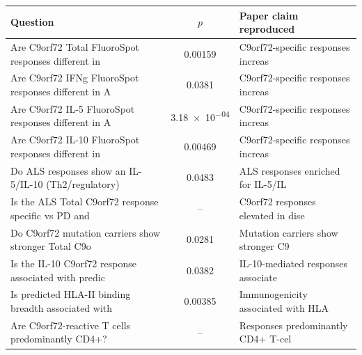 \begin{tabular}{p{6.2cm}cp{4.3cm}}
\toprule
Question & $p$ & Paper claim reproduced \\
\midrule
Are C9orf72 Total FluoroSpot responses different in  & 0.00159 & C9orf72-specific responses increas \\
Are C9orf72 IFNg FluoroSpot responses different in A & 0.0381 & C9orf72-specific responses increas \\
Are C9orf72 IL-5 FluoroSpot responses different in A & \num{3.18e-04} & C9orf72-specific responses increas \\
Are C9orf72 IL-10 FluoroSpot responses different in  & 0.00469 & C9orf72-specific responses increas \\
Do ALS responses show an IL-5/IL-10 (Th2/regulatory) & 0.0483 & ALS responses enriched for IL-5/IL \\
Is the ALS Total C9orf72 response specific vs PD and & -- & C9orf72 responses elevated in dise \\
Do C9orf72 mutation carriers show stronger Total C9o & 0.0281 & Mutation carriers show stronger C9 \\
Is the IL-10 C9orf72 response associated with predic & 0.0382 & IL-10-mediated responses associate \\
Is predicted HLA-II binding breadth associated with  & 0.00385 & Immunogenicity associated with HLA \\
Are C9orf72-reactive T cells predominantly CD4+? & -- & Responses predominantly CD4+ T-cel \\
\bottomrule
\end{tabular}
